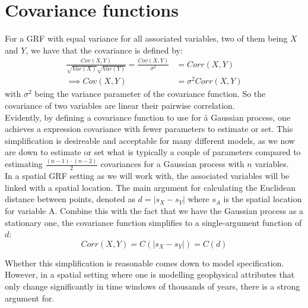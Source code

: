 \documentclass{report}
\begin{document}
\section{Covariance functions} \label{sec:covariance_functions}

For a GRF with equal variance for all associated variables, two of them being $X$ and $Y$, we have that the covariance is defined by:
\begin{align*}
\frac{Cov( X, Y )}{\sqrt{Var( X )}\sqrt{Var( Y )}} = \frac{Cov( X, Y )}{\sigma^2} &= Corr(X, Y) \\
\implies  Cov( X, Y ) &= \sigma^2 Corr(X, Y)
\end{align*}
with $\sigma^2$ being the variance parameter of the covariance function. So the covariance of two variables are linear their pairwise correlation. \\

Evidently, by defining a covariance function to use for å Gaussian process, one achieves a expression covariance with fewer parameters to estimate or set. This simplification is desireable and acceptable for many different models, as we now are down to estimate or set what is typically a couple of parameters compared to estimating $\frac{(n-1)\cdot(n - 2)}{2}$ covariances for a Gaussian process with $n$ variables. \\

In a spatial GRF setting as we will work with, the associated variables will be linked with a spatial location. The main argument for calculating the Euclidean distance between points, denoted as $d = |s_X - s_Y|$ where $s_A$ is the spatial location for variable A. Combine this with the fact that we have the Gaussian process as a stationary one, the covariance function simplifies to a single-argument function of $d$:
\begin{equation}
Corr(X, Y) = C(|s_X - s_Y|) = C(d)
\end{equation}

Whether this simplification is reasonable comes down to model specification. However, in a spatial setting where one is modelling geophysical attributes that only change significantly in time windows of thousands of years, there is a strong argument for. 
\end{document}
